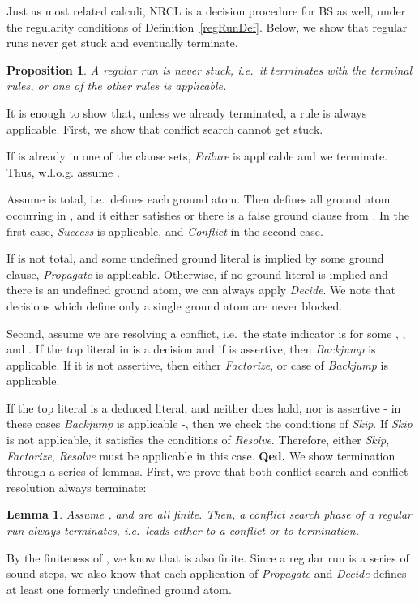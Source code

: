 \documentclass[a4paper]{article}
\newcommand{\mEPRs}{BS}
\newcommand{\startproof}{{\bf Proof:~}}
\newcommand{\finishproof}{{\bf Qed.}}
\newtheorem{prop}[defi]{Proposition}
\newtheorem{lemm}[defi]{Lemma}
\begin{document}
{Just as most related calculi, NRCL is a decision procedure for {\mEPRs} as well, under the regularity conditions of Definition~\ref{regRunDef}.
Below, we show that regular runs never get stuck and eventually terminate.

\begin{prop}\label{noStuckProp}
A regular run is never stuck,  i.e.\ 
it terminates with the terminal rules, or one of the other rules is applicable.
\end{prop}
\noindent\startproof
It is enough to show that, unless we already terminated, a rule is always applicable. First, we show that conflict search cannot get stuck.

If  is already in one of the clause sets, \emph{Failure} is applicable and we terminate. Thus, w.l.o.g. assume .

Assume  is total, i.e.\ 
defines each ground atom. Then  defines all ground atom occurring in ,
 and it either satisfies  or there is a 
false ground clause from . 
In the first case, \emph{Success} is applicable, and \emph{Conflict} in the second case.

If  is not total, and some undefined ground literal is implied by some ground clause, \emph{Propagate} is applicable. Otherwise, 
if no ground literal is implied and there is an undefined ground atom, we can always apply \emph{Decide}. 
We note that decisions which define only a single ground atom are never blocked.

Second, assume we are resolving a conflict, i.e.\ 
the state indicator is  for some , , and . 
If the top literal in  is a decision and if  is assertive, then \emph{Backjump} is applicable.
If it is not assertive, then either \emph{Factorize}, or case  of \emph{Backjump} is applicable.

If the top literal is a deduced literal, 
and neither does  hold, nor is  assertive - in these cases \emph{Backjump} is applicable -, 
then we check the conditions of \emph{Skip}.
If \emph{Skip} is not applicable, it satisfies the conditions of \emph{Resolve}. 
Therefore, either \emph{Skip}, \emph{Factorize}, \emph{Resolve} must be applicable in this case.
\finishproof\leaveabit
\noindent
We show termination through a series of lemmas. First, we prove that both conflict search and conflict resolution always terminate:

\begin{lemm}\label{csTerminatesTheo} Assume ,  and  are all finite.
Then, a conflict search phase of a regular run always terminates, i.e.\ 
leads either to a conflict or to termination.
\end{lemm}
\noindent\startproof
By the finiteness of , we know that  is also finite. 
Since a regular run is a series of sound steps, we also know that each application of \emph{Propagate} and \emph{Decide} 
defines at least one formerly undefined ground atom. 

}
\end{document}
